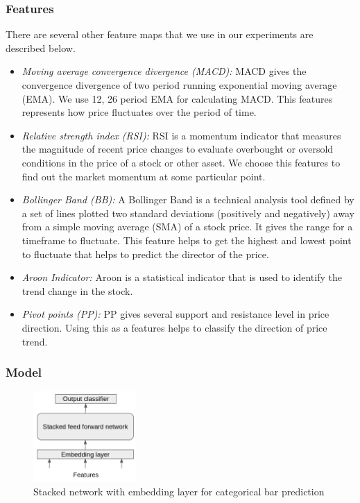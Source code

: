 \subsubsection{Features}
There are several other feature maps that we use in our experiments are described below.
\begin{itemize}
    \item {\em Moving average convergence divergence (MACD):} MACD gives the convergence divergence of two period running exponential moving average (EMA). We use 12, 26 period EMA for calculating MACD. This features represents how price fluctuates over the period of time.
    
    \item {\em Relative strength index (RSI):} RSI is a momentum indicator that measures the magnitude of recent price changes to evaluate overbought or oversold conditions in the price of a stock or other asset. We choose this features to find out the market momentum at some particular point.
    
    \item {\em Bollinger Band (BB):} A Bollinger Band is a technical analysis tool defined by a set of lines plotted two standard deviations (positively and negatively) away from a simple moving average (SMA) of a stock price. It gives the range for a timeframe to fluctuate. This feature helps to get the highest and lowest point to fluctuate that helps to predict the director of the price.
    
    \item {\em Aroon Indicator:} Aroon is a statistical indicator that is used to identify the trend change in the stock.
    
    \item {\em Pivot points (PP): } PP gives several support and resistance level in price direction. Using this as a features helps to classify the direction of price trend.
    
\end{itemize}

\subsubsection{Model}

\begin{figure}[htpb]
\begin{center}
\includegraphics[width=0.35\textwidth]{./figs/stacked_NN}
\vspace{-0.2cm}
\caption{Stacked network with embedding layer for categorical bar prediction}
\label{fig_stackNN}
\end{center}
\vspace{-0.4cm}
\end{figure}



